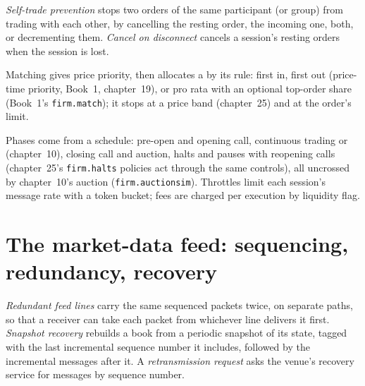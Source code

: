 \begin{definition}\label{def:mx:build-a-matching-engine-and-exchange-simulator:stp}
\emph{Self-trade prevention} stops two orders of the same participant (or group) from trading with each other, by cancelling
the resting order, the incoming one, both, or decrementing them. \emph{Cancel on disconnect} cancels a session's resting
orders when the session is lost.
\end{definition}

Matching gives price priority, then allocates a  by its rule: first in, first out (price-time priority, Book~1, chapter~19), or pro rata with an
optional top-order share (Book~1's \texttt{firm.match}); it stops at a price band (chapter~25) and at the order's limit.

\label{lst:mx:build-a-matching-engine-and-exchange-simulator:match}

Phases come from a schedule: pre-open and opening call, continuous trading or  (chapter~10), closing call and auction, halts and
pauses with reopening calls (chapter~25's \texttt{firm.halts} policies act through the same controls), all uncrossed by chapter~10's auction
(\texttt{firm.auctionsim}). Throttles limit each session's message rate with a token bucket; fees are charged per execution by liquidity flag.

\section{The market-data feed: sequencing, redundancy, recovery}

\begin{definition}\label{def:mx:build-a-matching-engine-and-exchange-simulator:feed}
\emph{Redundant feed lines} carry the same sequenced packets twice, on separate paths, so that a receiver can take each packet
from whichever line delivers it first. \emph{Snapshot recovery} rebuilds a book from a periodic snapshot of its state, tagged with
the last incremental sequence number it includes, followed by the incremental messages after it. A \emph{retransmission request} asks the venue's recovery service for messages by sequence number.
\end{definition}

